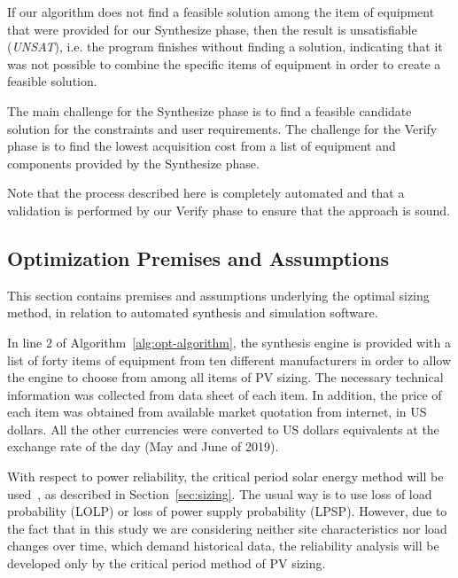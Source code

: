 If our algorithm does not find a feasible solution among the item of equipment that were provided for our {\sc Synthesize} phase,  then the result is unsatisfiable (\textit{UNSAT}), i.e. the program finishes without finding a solution, indicating that it was not possible to combine the specific items of equipment in order to create a feasible solution. 

The main challenge for the {\sc Synthesize} phase is to find a feasible candidate solution for the constraints and user requirements. The challenge for the {\sc Verify} phase is to find the lowest acquisition cost from a list of equipment and components provided by the {\sc Synthesize} phase. 

Note that the process described here is completely automated and that a validation is performed by our {\sc Verify} phase to ensure that the approach is sound.

\subsection{Optimization Premises and Assumptions}
\label{sec:OptAssumptions}

This section contains premises and assumptions underlying the optimal sizing method, in relation to automated synthesis and simulation software.

In line $2$ of Algorithm~\ref{alg:opt-algorithm}, the synthesis engine is provided with a list of forty items of equipment from ten different manufacturers in order to allow the engine to choose from among all items of PV sizing. The necessary technical information was collected from data sheet of each item. In addition, the price of each item was obtained from available market quotation from internet, in US dollars. All the other currencies were converted to US dollars equivalents at the exchange rate of the day (May and June of 2019).

With respect to power reliability, the critical period solar energy method will be used~\cite{Pinho}, as described in Section~\ref{sec:sizing}. The usual way is to use loss of load probability (LOLP) or loss of power supply probability (LPSP). However, due to the fact that in this study we are considering neither site characteristics nor load changes over time, which demand historical data, the reliability analysis will be developed only by the critical period method of PV sizing.

